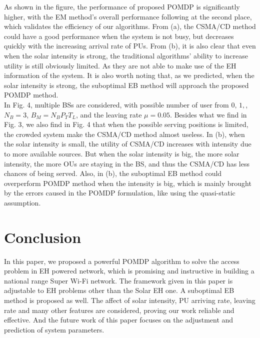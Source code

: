 \documentclass[conference]{IEEEtran}
\begin{document}
As shown in the figure, the performance of proposed POMDP is significantly higher,
with the EM method's overall performance following at the second place,
which validates the efficiency of our algorithms.
From (a), the CSMA/CD method could have a good performance when the system is not busy,
but decreases quickly with the increasing arrival rate of PUs.
From (b), it is also clear that even when the solar intensity is strong, 
the traditional algorithms' ability to increase utility is still obviously limited.
As they are not able to make use of the EH information of the system.
It is also worth noting that, as we predicted, when the solar intensity is strong,
the suboptimal EB method will approach the proposed POMDP method.\\
\indent In Fig. 4, multiple BSs are considered, with possible number of user from \(0,\, 1,\), \(N_B = 3\), \(B_M = N_BP_TT_L\),
and the leaving rate \(\mu = 0.05\). 
Besides what we find in Fig. 3, we also find in Fig. 4 
that when the possible serving positions is limited, the crowded system make the CSMA/CD method almost useless.
In (b), when the solar intensity is small, the utility of CSMA/CD increases with intensity due to more available sources.
But when the solar intensity is big, 
the more solar intensity, the more OUs are staying in the BS, 
and thus the CSMA/CD has less chances of being served.
Also, in (b), the suboptimal EB method could overperform POMDP method when the intensity is big, 
which is mainly brought by the errors caused in the POMDP formulation, like using the quasi-static assumption.
\section{Conclusion}
In this paper, we proposed a powerful POMDP algorithm to solve the access problem in EH powered network,
which is promising and instructive in building a national range Super Wi-Fi network.
The framework given in this paper is adjustable to EH problems other than the Solar EH one.
A suboptimal EB method is proposed as well.
The affect of solar intensity, PU arriving rate, leaving rate and many other features are considered, 
proving our work reliable and effective.
And the future work of this paper focuses on the adjustment and prediction of system parameters.


\end{document}

